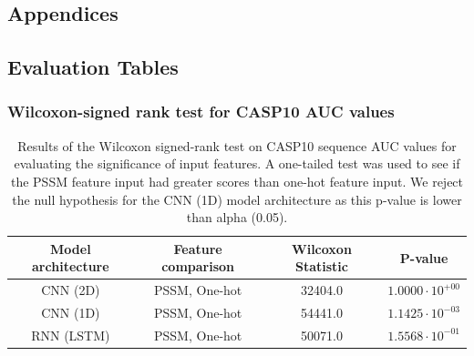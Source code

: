 \documentclass{l4proj}
\begin{document}
\begin{appendices}

\chapter{Appendices}

\section{Evaluation Tables}

\subsection{Wilcoxon-signed rank test for CASP10 AUC values}
\label{chap:appendix sec:casp10auc}

\begin{table}[!htb]
    \centering
    \caption{Results of the Wilcoxon signed-rank test on CASP10 sequence AUC values for evaluating the significance of input features. A one-tailed test was used to see if the PSSM feature input had greater scores than one-hot feature input. We reject the null hypothesis for the CNN (1D) model architecture as this p-value is lower than alpha (0.05).}
    \begin{tabular}{@{}cccc@{}}
    \toprule
    Model architecture & Feature comparison & Wilcoxon Statistic & P-value \\ \midrule
    CNN (2D) & PSSM, One-hot & 32404.0 & $1.0000\cdot{10^{+00}}$ \\
    CNN (1D) & PSSM, One-hot & 54441.0 & $1.1425\cdot{10^{-03}}$ \\
    RNN (LSTM) & PSSM, One-hot & 50071.0 & $1.5568\cdot{10^{-01}}$ \\ \bottomrule
    \end{tabular}
    
    \label{tab:auccaspwilcinput}
\end{table}


\end{appendices}
\end{document}
